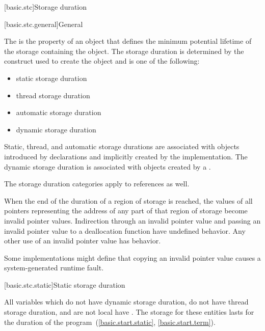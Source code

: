 [basic.stc]{Storage duration}

[basic.stc.general]{General}

\pnum
{}%
The  is the property of an object that defines the minimum
potential lifetime of the storage containing the object. The storage
duration is determined by the construct used to create the object and is
one of the following:
\begin{itemize}
\item static storage duration
\item thread storage duration
\item automatic storage duration
\item dynamic storage duration
\end{itemize}

\pnum
{}%
%
%
%
Static, thread, and automatic storage durations are associated with objects
introduced by declarations and implicitly created by
the implementation. The dynamic storage duration
is associated with objects created by a
.

\pnum
The storage duration categories apply to references as well.

\pnum
When the end of the duration of a region of storage is reached,
the values of all pointers
representing the address of any part of that region of storage
become invalid pointer values.
Indirection through an invalid pointer value and
passing an invalid pointer value to a deallocation function
have undefined behavior.
Any other use of an invalid pointer value has
behavior.
\begin{footnote}
Some implementations might define that
copying an invalid pointer value
causes a system-generated runtime fault.
\end{footnote}

[basic.stc.static]{Static storage duration}

\pnum
{}%
All variables which do not have dynamic storage duration, do not have thread
storage duration, and are not local
have . The
storage for these entities lasts for the duration of the
program~(\ref{basic.start.static}, \ref{basic.start.term}).

